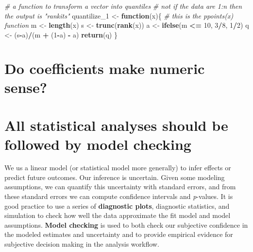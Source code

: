 \documentclass[]{book}
\newenvironment{Shaded}{\begin{snugshade}}{\end{snugshade}}
\newcommand{\CommentTok}[1]{\textcolor[rgb]{0.56,0.35,0.01}{\textit{#1}}}
\newcommand{\ControlFlowTok}[1]{\textcolor[rgb]{0.13,0.29,0.53}{\textbf{#1}}}
\newcommand{\DecValTok}[1]{\textcolor[rgb]{0.00,0.00,0.81}{#1}}
\newcommand{\KeywordTok}[1]{\textcolor[rgb]{0.13,0.29,0.53}{\textbf{#1}}}
\newcommand{\NormalTok}[1]{#1}
\newcommand{\OperatorTok}[1]{\textcolor[rgb]{0.81,0.36,0.00}{\textbf{#1}}}
\newcommand{\StringTok}[1]{\textcolor[rgb]{0.31,0.60,0.02}{#1}}
\begin{document}
\begin{Shaded}
\begin{Highlighting}[]
\CommentTok{# a function to transform a vector into quantiles}
\CommentTok{# not if the data are 1:n then the output is "rankits"}
\NormalTok{quantilize_}\DecValTok{1}\NormalTok{ <-}\StringTok{ }\ControlFlowTok{function}\NormalTok{(x)\{}
  \CommentTok{# this is the ppoints(x) function}
\NormalTok{  m <-}\StringTok{ }\KeywordTok{length}\NormalTok{(x)}
\NormalTok{  s <-}\StringTok{ }\KeywordTok{trunc}\NormalTok{(}\KeywordTok{rank}\NormalTok{(x))}
\NormalTok{  a <-}\StringTok{ }\KeywordTok{ifelse}\NormalTok{(m }\OperatorTok{<=}\StringTok{ }\DecValTok{10}\NormalTok{, }\DecValTok{3}\OperatorTok{/}\DecValTok{8}\NormalTok{, }\DecValTok{1}\OperatorTok{/}\DecValTok{2}\NormalTok{)}
\NormalTok{  q <-}\StringTok{ }\NormalTok{(s}\OperatorTok{-}\NormalTok{a)}\OperatorTok{/}\NormalTok{(m }\OperatorTok{+}\StringTok{ }\NormalTok{(}\DecValTok{1}\OperatorTok{-}\NormalTok{a) }\OperatorTok{-}\StringTok{ }\NormalTok{a)}
  \KeywordTok{return}\NormalTok{(q)}
\NormalTok{\}}
\end{Highlighting}
\end{Shaded}

\hypertarget{do-coefficients-make-numeric-sense}{%
\section{Do coefficients make numeric sense?}\label{do-coefficients-make-numeric-sense}}

\hypertarget{all-statistical-analyses-should-be-followed-by-model-checking}{%
\section{All statistical analyses should be followed by model checking}\label{all-statistical-analyses-should-be-followed-by-model-checking}}

We us a linear model (or statistical model more generally) to infer effects or predict future outcomes. Our inference is uncertain. Given some modeling assumptions, we can quantify this uncertainty with standard errors, and from these standard errors we can compute confidence intervals and \emph{p}-values. It is good practice to use a series of \textbf{diagnostic plots}, diagnostic statistics, and simulation to check how well the data approximate the fit model and model assumptions. \textbf{Model checking} is used to both check our subjective confidence in the modeled estimates and uncertainty and to provide empirical evidence for subjective decision making in the analysis workflow.
\end{document}

